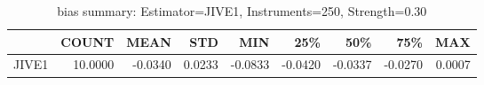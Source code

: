 \begin{table}[ht]
\centering
\caption{bias summary: Estimator=JIVE1, Instruments=250, Strength=0.30}
\begin{tabular}{lrrrrrrrr}
\toprule
 & COUNT & MEAN & STD & MIN & 25\% & 50\% & 75\% & MAX \\
\midrule
JIVE1 & 10.0000 & -0.0340 & 0.0233 & -0.0833 & -0.0420 & -0.0337 & -0.0270 & 0.0007 \\
\bottomrule
\end{tabular}
\end{table}
